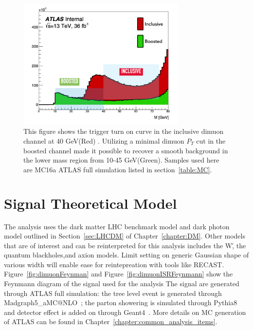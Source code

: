 \begin{figure}[!htb]
    \begin{center}
        \includegraphics[width=0.75\textwidth]{figures/chapter_dimuon/turnon}
        \caption{
        This figure shows the trigger turn on curve in the inclusive dimuon channel at 40 GeV(Red) . Utilizing a minimal dimuon $P_{T}$ cut in the boosted channel made it possible to recover a smooth background in the lower mass region from 10-45 GeV(Green). Samples used here are MC16a ATLAS full simulation listed in section~\ref{table:MC}.
        }
        \label{fig:turnon}
    \end{center}
\end{figure}

\section{Signal Theoretical Model}
The analysis uses the dark matter LHC benchmark model and dark photon model outlined in Section~\ref{sec:LHCDM} of Chapter~\ref{chapter:DM}.
Other models that are of interest and can be reinterpreted for this analysis includes the W\', the quantum blackholes,and axion models. Limit setting on generic Gaussian shape of various width will enable ease for reintepreation with tools like RECAST.
Figure~\ref{fig:dimuonFeynman} and Figure~\ref{fig:dimuonISRFeynmann} show the Feynmann diagram of the signal used for the analysis 
The signal are generated through ATLAS full simulation: the tree level event is generated through Madgraph5\_aMC@NLO~\cite{}; the parton showering is simulated through Pythia8~\cite{} and detector effect is added on through Geant4~\cite{}. More details on MC generation of ATLAS can be found in Chapter~\ref{chapter:common_analysis_items}.

